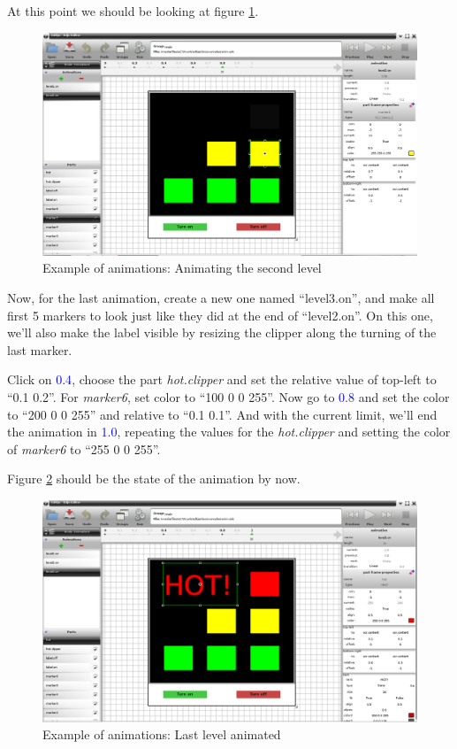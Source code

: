 \documentclass[a4paper]{profusion}
\newcommand{\GUIIcon}[1]{\textcolor{blue}{#1}}    %
\begin{document}
At this point we should be looking at figure \ref{fig:anim1_level2}.

\begin{figure}[h!]
  \centering
  \includegraphics[width=1.0\textwidth]{examples/anim1_level2.png}
  \caption{Example of animations: Animating the second level}
  \label{fig:anim1_level2}
\end{figure}

Now, for the last animation, create a new one named ``level3.on'', and
make all first 5 markers to look just like they did at the end of
``level2.on''. On this one, we'll also make the label visible by
resizing the clipper along the turning of the last marker.

Click on \GUIIcon{0.4}, choose the part \emph{hot.clipper} and set the
relative value of top-left to ``0.1 0.2''. For \emph{marker6}, set
color to ``100 0 0 255''. Now go to \GUIIcon{0.8} and set the color to
``200 0 0 255'' and relative to ``0.1 0.1''. And with the current
limit, we'll end the animation in \GUIIcon{1.0}, repeating the values
for the \emph{hot.clipper} and setting the color of \emph{marker6} to
``255 0 0 255''.

Figure \ref{fig:anim1_level3} should be the state of the animation by
now.

\begin{figure}[h!]
  \centering
  \includegraphics[width=1.0\textwidth]{examples/anim1_level3.png}
  \caption{Example of animations: Last level animated}
  \label{fig:anim1_level3}
\end{figure}
\end{document}
